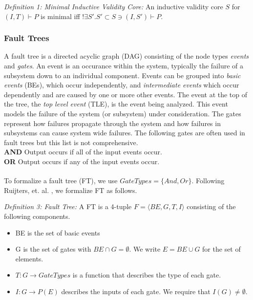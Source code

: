 \textit{Definition 1: Minimal Inductive Validity Core:} An inductive validity core $S$ for $(I,T) \vdash P$ is minimal iff $! \exists S' . S' \subset S \ni (I,S') \vdash P$. \\

\subsubsection{Fault Trees}
A fault tree is a directed acyclic graph (DAG) consisting of the node types \textit{events} and \textit{gates}. An event is an occurance within the system, typically the failure of a subsystem down to an individual component. Events can be grouped into \textit{basic events} (BEs), which occur independently, and \textit{intermediate events} which occur dependently and are caused by one or more other events. The event at the top of the tree, the \textit{top level event} (TLE), is the event being analyzed. This event models the failure of the system (or subsystem) under consideration. The gates represent how failures propagate through the system and how failures in subsystems can cause system wide failures. The following gates are often used in fault trees but this list is not comprehensive. \\
\textbf{AND} Output occurs if all of the input events occur.\\
\textbf{OR} Output occurs if any of the input events occur.\\

\\

To formalize a fault tree (FT), we use $GateTypes = \{And, Or\}$. Following Ruijters, et. al. \cite{RuijtersSurvey}, we formalize FT as follows. 

\textit{Definition 3: Fault Tree:} A FT is a 4-tuple $F = \langle BE, G, T, I \rangle$ consisting of the following components. 
\begin{itemize}
\item BE is the set of basic events
\item G is the set of gates with $BE \cap G = \emptyset$. We write $E = BE \cup G$ for the set of elements.
\item $T: G \to GateTypes$ is a function that describes the type of each gate.
\item $I: G \to P(E)$ describes the inputs of each gate. We require that $I(G) \neq \emptyset$.
\end{itemize}

